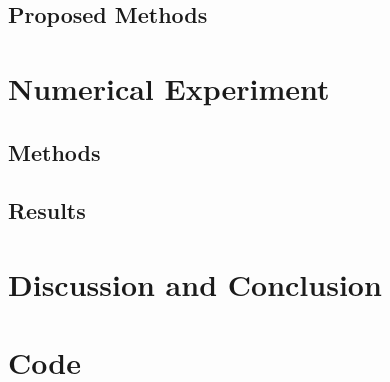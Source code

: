 \documentclass[12pt]{article}
\numberwithin{equation}{section}
\begin{document}
\subsection{Proposed Methods}


 
\section{Numerical Experiment}

\subsection{Methods}

\subsection{Results}


\section{Discussion and Conclusion}





\newpage

\appendix
\appendixpage

\section{Code}






\end{document}
